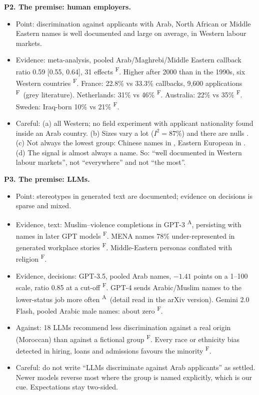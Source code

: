 \documentclass[11pt]{article}
\newcommand{\vF}{\textsuperscript{F}} %
\newcommand{\vA}{\textsuperscript{A}} %
\newcommand{\para}[1]{\smallskip\noindent\textbf{#1}}
\begin{document}
\para{P2. The premise: human employers.}
\begin{itemize}
\item Point: discrimination against applicants with Arab, North African or Middle Eastern names is well documented and large on average, in Western labour markets.
\item Evidence: meta-analysis, pooled Arab/Maghrebi/Middle Eastern callback ratio 0.59 [0.55, 0.64], 31 effects \citep{lippens2023state}\vF. Higher after 2000 than in the 1990s, six Western countries \citep{quillian2023trends}\vF. France: 22.8\% vs 33.3\% callbacks, 9,600 applications \citep{arnoult2021discrimination}\vF\ (grey literature). Netherlands: 31\% vs 46\% \citep{thijssen2021ethnic}\vF. Australia: 22\% vs 35\% \citep{booth2012does}\vF. Sweden: Iraq-born 10\% vs 21\% \citep{vernby2019immigrants}\vF.
\item Careful: (a) all Western; no field experiment with applicant nationality found inside an Arab country. (b) Sizes vary a lot ($I^2 = 87\%$) and there are nulls \citep{challe2024cyclical,baert2017does}. (c) Not always the lowest group: Chinese names in \citet{booth2012does}, Eastern European in \citet{lippens2023understanding}. (d) The signal is almost always a name. So: ``well documented in Western labour markets'', not ``everywhere'' and not ``the most''.
\end{itemize}

\para{P3. The premise: LLMs.}
\begin{itemize}
\item Point: stereotypes in generated text are documented; evidence on decisions is sparse and mixed.
\item Evidence, text: Muslim--violence completions in GPT-3 \citep{abid2021persistent}\vA, persisting with names in later GPT models \citep{hemmatian2023muslim}\vF. MENA names 78\% under-represented in generated workplace stories \citep{shieh2026intersectional}\vF. Middle-Eastern personas conflated with religion \citep{cheng2023marked}\vF.
\item Evidence, decisions: GPT-3.5, pooled Arab names, $-1.41$ points on a 1--100 scale, ratio 0.85 at a cut-off \citep{lippens2024computer}\vF. GPT-4 sends Arabic/Muslim names to the lower-status job more often \citep{bai2025explicitly}\vA\ (detail read in the arXiv version). Gemini 2.0 Flash, pooled Arabic male names: about zero \citep{hoffmann2026evaluating}\vF.
\item Against: 18 LLMs recommend less discrimination against a real origin (Moroccan) than against a fictional group \citep{bunel2026customer}\vF. Every race or ethnicity bias detected in hiring, loans and admissions favours the minority \citep{arcuschin2026blind}\vF.
\item Careful: do not write ``LLMs discriminate against Arab applicants'' as settled. Newer models reverse most where the group is named explicitly, which is our cue. Expectations stay two-sided.
\end{itemize}
\end{document}
